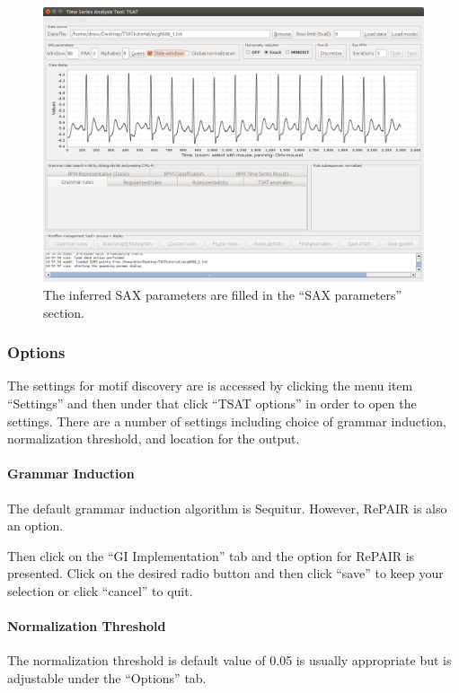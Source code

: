\documentclass[titlepage, letterpaper, 12pt]{article}
\begin{document}
\begin{figure}[H]
	\centering
	\includegraphics[width=\textwidth]{pictures/motifguide/step3-guessresults}
	\caption{The inferred SAX parameters are filled in the ``SAX parameters'' section.}
	\label{fig:step3-guessresults}
\end{figure}

\subsubsection{Options}

The settings for motif discovery are is accessed by clicking the menu item ``Settings'' and then under that click ``TSAT options'' in order to open the settings.  There are a number of settings including choice of grammar induction, normalization threshold, and location for the output.

\paragraph{Grammar Induction}
The default grammar induction algorithm is Sequitur.  However, RePAIR is also an option. 

Then click on the ``GI Implementation'' tab and the option for RePAIR is presented.  Click on the desired radio button and then click ``save'' to keep your selection or click ``cancel'' to quit.

\paragraph{Normalization Threshold}
The normalization threshold is default value of 0.05 is usually appropriate but is adjustable under the ``Options'' tab.
\end{document}
